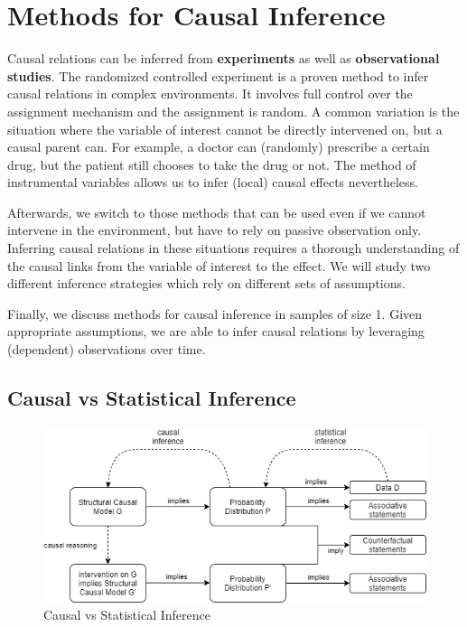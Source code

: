 \documentclass[
]{book}
\theoremstyle{definition}
\theoremstyle{definition}
\theoremstyle{definition}
\theoremstyle{remark}
\begin{document}
\hypertarget{methods-for-causal-inference}{%
\chapter{Methods for Causal Inference}\label{methods-for-causal-inference}}

Causal relations can be inferred from \textbf{experiments} as well as \textbf{observational studies}.
The randomized controlled experiment is a proven method to infer causal relations in complex environments. It involves full control over the assignment mechanism and the assignment is random.
A common variation is the situation where the variable of interest cannot be directly intervened on, but a causal parent can. For example, a doctor can (randomly) prescribe a certain drug, but the patient still chooses to take the drug or not. The method of instrumental variables allows us to infer (local) causal effects nevertheless.

Afterwards, we switch to those methods that can be used even if we cannot intervene in the environment, but have to rely on passive observation only. Inferring causal relations in these situations requires a thorough understanding of the causal links from the variable of interest to the effect. We will study two different inference strategies which rely on different sets of assumptions.

Finally, we discuss methods for causal inference in samples of size 1. Given appropriate assumptions, we are able to infer causal relations by leveraging (dependent) observations over time.

\hypertarget{causal-vs-statistical-inference}{%
\section{Causal vs Statistical Inference}\label{causal-vs-statistical-inference}}

\begin{figure}
\centering
\includegraphics{images/hierarchy_statistical_vs_causal.png}
\caption{Causal vs Statistical Inference}
\end{figure}
\end{document}
